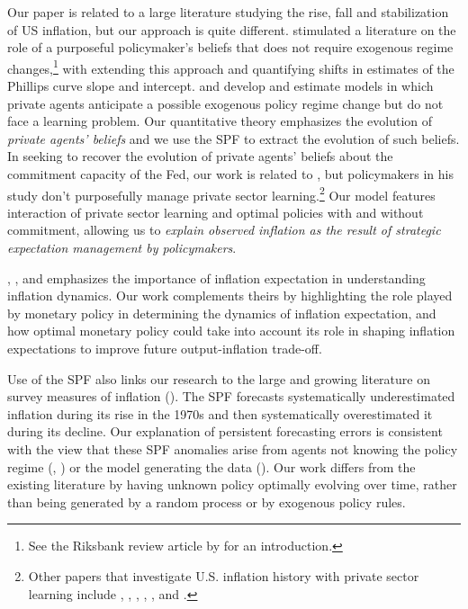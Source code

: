 \documentclass[12pt,letter,leqno]{article}
\theoremstyle{asn}
\theoremstyle{lem}
\theoremstyle{slem}
\theoremstyle{prop}
\theoremstyle{appprop}
\theoremstyle{rem}
\theoremstyle{defn}
\begin{document}
Our paper is related to a large literature studying the rise, fall and stabilization of US inflation, but our approach is quite different. 
\cite{sargent_conquest_1999} stimulated a literature on the role of a purposeful policymaker's beliefs that does not require exogenous regime changes,\footnote{See the Riksbank review article by \cite{sargent_conquest_2000} for an introduction.} with \cite{Primiceri2006} extending this approach and quantifying shifts in estimates of the Phillips curve slope and intercept.
\cite{Bianchi2013} and \cite{Debortoli2016} develop and estimate models in which private agents anticipate a possible exogenous policy regime change but do not face a learning problem. Our quantitative theory emphasizes the evolution of \textit{private agents' beliefs} and we use the SPF to extract the evolution of such beliefs. In seeking to recover the evolution of private agents' beliefs about the commitment capacity of the Fed, our work is related to \cite{matthes_figuring_2015}, but policymakers in his study don't purposefully manage private sector learning.\footnote{\label{fn:learning} Other papers that investigate U.S. inflation history with private sector learning include \cite{ball_disinflation}, \cite{erceg_imperfect_2003}, \cite{ORPHANIDES20051927}, \cite{goodfriend_incredible_2005}, \cite{Cogley2015}, and \cite{Melosi2016}.} Our model features interaction of private sector learning and optimal policies with and without commitment, allowing us to \textit{explain observed inflation as the result of strategic expectation management by policymakers}.

\cite{Hazelletal2022}, \cite{carvalho_anchored_2023}, and \cite{beaudry_dominant_2024} emphasizes the importance of inflation expectation in understanding inflation dynamics. Our work complements theirs by highlighting the role played by monetary policy in determining the dynamics of inflation expectation, and how optimal monetary policy could take into account its role in shaping inflation expectations to improve future output-inflation trade-off. 

Use of the SPF also links our research to the large and growing literature on survey measures of inflation (\cite{coibion_formation_2018}).  The SPF forecasts systematically underestimated inflation during its rise in the 1970s and then systematically overestimated it during its decline. Our explanation of persistent forecasting errors is consistent with
the view that these SPF anomalies arise from agents not knowing the policy regime (\cite{evans_inflation_1993}, \cite{coibion_formation_2018}) or the model generating the data (\cite{NBERw29495}). Our work differs from the existing literature by having unknown policy optimally evolving over time, rather than being generated by a random process or by exogenous policy rules.
\end{document}
